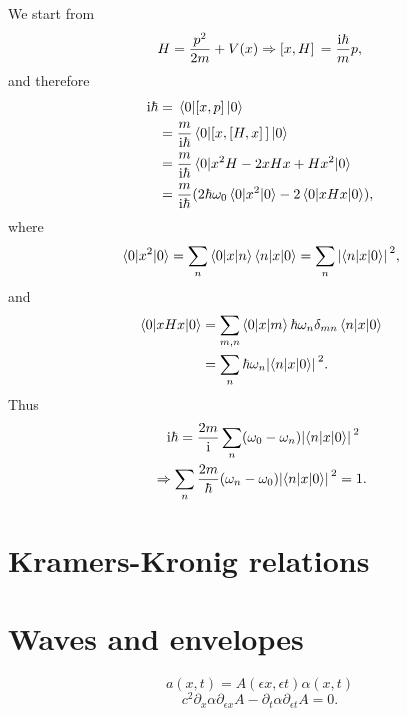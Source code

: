 \documentclass[hyperref, a4paper]{article}
\newcommand*{\ii}{\mathrm{i}}
\begin{document}
We start from 
\begin{equation}
    H = \frac{p^2}{2m} + V(x) \Rightarrow \comm*{x}{H} = \frac{\ii \hbar}{m} p,
\end{equation}
and therefore 
\begin{equation}
    \begin{aligned}
        \ii \hbar &= \expval*{\comm*{x}{p}}{0} \\
        &= \frac{m}{\ii \hbar} \expval*{\comm*{x}{\comm*{H}{x}}}{0} \\
        &= \frac{m}{\ii \hbar} \expval*{
            x^2 H - 2 xHx + H x^2
        }{0} \\
        &= \frac{m}{\ii \hbar} (
            2 \hbar \omega_0 \expval*{x^2}{0} 
            - 2 \expval*{x H x}{0}
        ) ,
    \end{aligned}
\end{equation}
where 
\begin{equation}
    \begin{aligned}
        \expval*{x^2}{0} = \sum_{n} \mel**{0}{x}{n} \mel**{n}{x}{0} 
        = \sum_n \abs*{\mel**{n}{x}{0}}^2,
    \end{aligned}
\end{equation}
and 
\begin{equation}
    \begin{aligned}
        \expval*{x H x}{0} &= \sum_{m, n} \mel**{0}{x}{m} \hbar \omega_n \delta_{mn} \mel**{n}{x}{0} \\
        &= \sum_n \hbar \omega_n \abs*{\mel**{n}{x}{0}}^2.
    \end{aligned}
\end{equation}
Thus 
\begin{equation}
    \begin{aligned}
        &\quad \ii \hbar = \frac{2m}{\ii} \sum_n (\omega_0 - \omega_n) \abs*{\mel**{n}{x}{0}}^2 \\
        &\Rightarrow \sum_n \frac{2m}{\hbar} (\omega_n - \omega_0) \abs*{\mel**{n}{x}{0}}^2 = 1.
    \end{aligned}
\end{equation}

\section{Kramers-Kronig relations}

\section{Waves and envelopes}

\begin{equation}
    a(x, t) = A(\epsilon x, \epsilon t) \alpha(x, t)
\end{equation}
\begin{equation}
    c^2 \partial_x \alpha \partial_{\epsilon x} A - \partial_t \alpha \partial_{\epsilon t} A = 0.
\end{equation}
\end{document}
